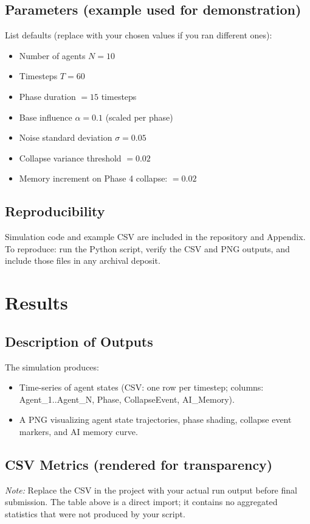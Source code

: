 \documentclass[12pt]{article}
\begin{document}
\subsection{Parameters (example used for demonstration)}
List defaults (replace with your chosen values if you ran different ones):
\begin{itemize}
  \item Number of agents \(N = 10\)
  \item Timesteps \(T = 60\)
  \item Phase duration \(= 15\) timesteps
  \item Base influence \(\alpha = 0.1\) (scaled per phase)
  \item Noise standard deviation \(\sigma = 0.05\)
  \item Collapse variance threshold \(= 0.02\)
  \item Memory increment on Phase 4 collapse: \(= 0.02\)
\end{itemize}

\subsection{Reproducibility}
Simulation code and example CSV are included in the repository and Appendix. To reproduce: run the Python script, verify the CSV and PNG outputs, and include those files in any archival deposit.

\section{Results}
\subsection{Description of Outputs}
The simulation produces:
\begin{itemize}
  \item Time-series of agent states (CSV: one row per timestep; columns: Agent\_1..Agent\_N, Phase, CollapseEvent, AI\_Memory).
  \item A PNG visualizing agent state trajectories, phase shading, collapse event markers, and AI memory curve.
\end{itemize}

\subsection{CSV Metrics (rendered for transparency)}
\begin{tcolorbox}[breakable, enhanced, title=Simulation CSV excerpt,
  colback=green!5!white, colframe=green!60!black]
\end{tcolorbox}
\textit{Note:} Replace the CSV in the project with your actual run output before final submission. The table above is a direct import; it contains no aggregated statistics that were not produced by your script.
\end{document}
